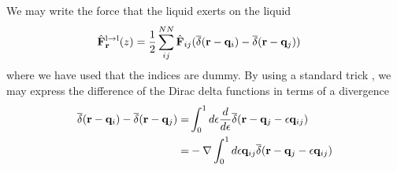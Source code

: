 \documentclass[b5paper,openright,11pt]{book}
\begin{document}
We may write the force that the liquid exerts on the liquid 
\begin{align}
  \hat{\bf F}^{\rm l\to l}_{\bf r}(z) &= \frac{1}{2}\sum^{NN}_{ij}\hat{\bf F}_{ij}
(\overline\delta({\bf r}-{\bf q}_i)-\overline\delta({\bf r}-{\bf q}_j))
\end{align}
where we  have used that  the indices are  dummy. By using  a standard
trick \cite{Schofield1982,Grabert1982}, we  may express the difference
of the Dirac delta functions in terms of a divergence
\begin{eqnarray}
\overline\delta({\bf r}-{\bf q}_i)-\overline\delta({\bf r}-{\bf q}_j)
=&\int_0^1d\epsilon\frac{d}{d\epsilon}
\overline\delta({\bf r}-{\bf q}_j-\epsilon{\bf q}_{ij})
\nonumber\\
=&-\nabla\int_0^1d\epsilon{\bf q}_{ij}
\overline\delta({\bf r}-{\bf q}_j-\epsilon{\bf q}_{ij})
\nonumber\\
\label{trick}
\end{eqnarray}
\end{document}
